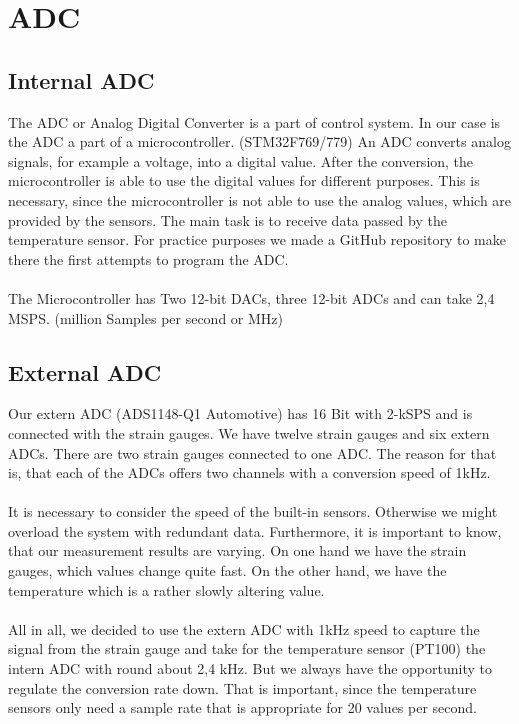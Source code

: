 \chapter{ADC}
\section{Internal ADC}
The ADC or Analog Digital Converter is a part of control system. In our case is the ADC a part of a microcontroller. (STM32F769/779) An ADC converts analog signals, for example a voltage, into a digital value. After the conversion, the microcontroller is able to use the digital values for different purposes. This is necessary, since the microcontroller is not able to use the analog values, which are provided by the sensors. The main task is to receive data passed by the temperature sensor. For practice purposes we made a GitHub repository to make there the first attempts to program the ADC. \\ \\
The Microcontroller has Two 12-bit DACs, three 12-bit ADCs and can take 2,4 MSPS. (million Samples per second or MHz) 
\section{External ADC}
Our extern ADC (ADS1148-Q1 Automotive) has 16 Bit with 2-kSPS and is connected with the strain gauges. We have twelve strain gauges and six extern ADCs. There are two strain gauges connected to one ADC. The reason for that is, that each of the ADCs offers two channels with a conversion speed of 1kHz. \\ \\
It is necessary to consider the speed of the built-in sensors. Otherwise we might overload the system with redundant data. Furthermore, it is important to know, that our measurement results are varying. On one hand we have the strain gauges, which values change quite fast. On the other hand, we have the temperature which is a rather slowly altering value. \\ \\
All in all, we decided to use the extern ADC with 1kHz speed to capture the signal from the strain gauge and take for the temperature sensor (PT100) the intern
ADC with round about 2,4 kHz. But we always have the opportunity to regulate
the conversion rate down. That is important, since the temperature sensors only need
a sample rate that is appropriate for 20 values per second.
